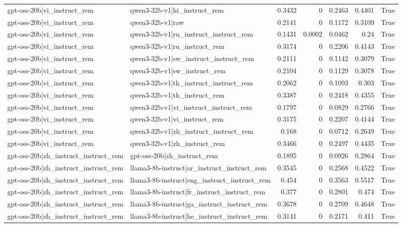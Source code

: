 \begin{table}
\begin{tabular}{l l r r r r l}
gpt-oss-20b|vi_instruct_rem & qwen3-32b-v1|hi_instruct_rem & 0.3432 & 0 & 0.2463 & 0.4401 & True \\
gpt-oss-20b|vi_instruct_rem & qwen3-32b-v1|raw & 0.2141 & 0 & 0.1172 & 0.3109 & True \\
gpt-oss-20b|vi_instruct_rem & qwen3-32b-v1|ru_instruct_instruct_rem & 0.1431 & 0.0002 & 0.0462 & 0.24 & True \\
gpt-oss-20b|vi_instruct_rem & qwen3-32b-v1|ru_instruct_rem & 0.3174 & 0 & 0.2206 & 0.4143 & True \\
gpt-oss-20b|vi_instruct_rem & qwen3-32b-v1|sw_instruct_instruct_rem & 0.2111 & 0 & 0.1142 & 0.3079 & True \\
gpt-oss-20b|vi_instruct_rem & qwen3-32b-v1|sw_instruct_rem & 0.2104 & 0 & 0.1129 & 0.3078 & True \\
gpt-oss-20b|vi_instruct_rem & qwen3-32b-v1|th_instruct_instruct_rem & 0.2062 & 0 & 0.1093 & 0.303 & True \\
gpt-oss-20b|vi_instruct_rem & qwen3-32b-v1|th_instruct_rem & 0.3387 & 0 & 0.2418 & 0.4355 & True \\
gpt-oss-20b|vi_instruct_rem & qwen3-32b-v1|vi_instruct_instruct_rem & 0.1797 & 0 & 0.0829 & 0.2766 & True \\
gpt-oss-20b|vi_instruct_rem & qwen3-32b-v1|vi_instruct_rem & 0.3175 & 0 & 0.2207 & 0.4144 & True \\
gpt-oss-20b|vi_instruct_rem & qwen3-32b-v1|zh_instruct_instruct_rem & 0.168 & 0 & 0.0712 & 0.2649 & True \\
gpt-oss-20b|vi_instruct_rem & qwen3-32b-v1|zh_instruct_rem & 0.3466 & 0 & 0.2497 & 0.4435 & True \\
gpt-oss-20b|zh_instruct_instruct_rem & gpt-oss-20b|zh_instruct_rem & 0.1895 & 0 & 0.0926 & 0.2864 & True \\
gpt-oss-20b|zh_instruct_instruct_rem & llama3-8b-instruct|ar_instruct_instruct_rem & 0.3545 & 0 & 0.2568 & 0.4522 & True \\
gpt-oss-20b|zh_instruct_instruct_rem & llama3-8b-instruct|eng_instruct_instruct_rem & 0.454 & 0 & 0.3563 & 0.5517 & True \\
gpt-oss-20b|zh_instruct_instruct_rem & llama3-8b-instruct|fr_instruct_instruct_rem & 0.377 & 0 & 0.2801 & 0.474 & True \\
gpt-oss-20b|zh_instruct_instruct_rem & llama3-8b-instruct|ga_instruct_instruct_rem & 0.3678 & 0 & 0.2709 & 0.4648 & True \\
gpt-oss-20b|zh_instruct_instruct_rem & llama3-8b-instruct|he_instruct_instruct_rem & 0.3141 & 0 & 0.2171 & 0.411 & True \\

\end{tabular}
\end{table}
